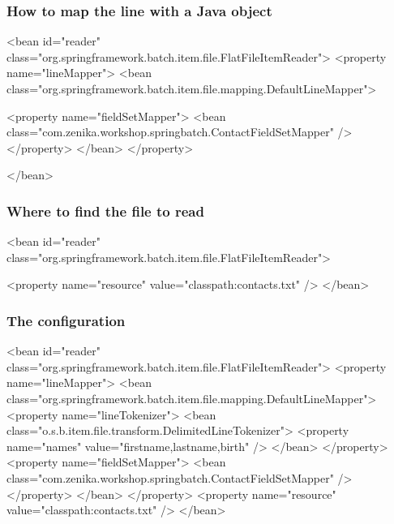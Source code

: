 \begin{frame}[fragile]
 \frametitle{How to map the line with a Java object}


\begin{xmlcode}
<bean id="reader"
      class="org.springframework.batch.item.file.FlatFileItemReader">
  <property name="lineMapper">
    <bean class="org.springframework.batch.item.file.mapping.DefaultLineMapper">





      <property name="fieldSetMapper">
        <bean class="com.zenika.workshop.springbatch.ContactFieldSetMapper" />
      </property>
    </bean>
  </property>

</bean>
\end{xmlcode}

\end{frame}

\begin{frame}[fragile]
 \frametitle{Where to find the file to read}

\begin{xmlcode}
<bean id="reader"
      class="org.springframework.batch.item.file.FlatFileItemReader">












  <property name="resource" value="classpath:contacts.txt" />
</bean>
\end{xmlcode}

\end{frame}

\begin{frame}[fragile]
 \frametitle{The  configuration}

\begin{xmlcode}
<bean id="reader"
      class="org.springframework.batch.item.file.FlatFileItemReader">
  <property name="lineMapper">
    <bean class="org.springframework.batch.item.file.mapping.DefaultLineMapper">
      <property name="lineTokenizer">
        <bean class="o.s.b.item.file.transform.DelimitedLineTokenizer">
          <property name="names" value="firstname,lastname,birth" />
        </bean>
      </property>
      <property name="fieldSetMapper">
        <bean class="com.zenika.workshop.springbatch.ContactFieldSetMapper" />
      </property>
    </bean>
  </property>
  <property name="resource" value="classpath:contacts.txt" />
</bean>
\end{xmlcode}

\end{frame}

